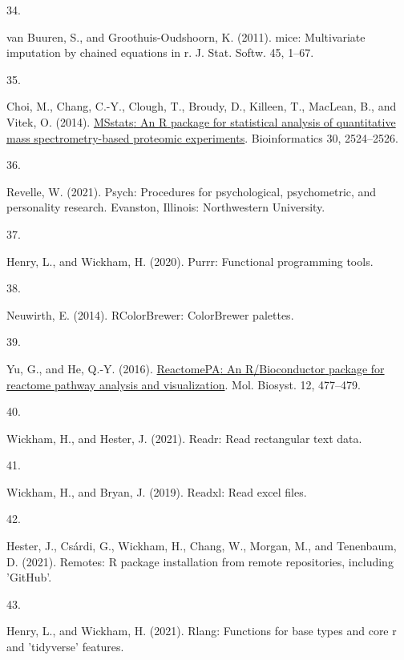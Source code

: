 \documentclass[
]{article}
\newlength{\cslhangindent}
\newlength{\csllabelwidth}
\newlength{\cslentryspacingunit} %
\newenvironment{CSLReferences}[2] %
 {%
  \setlength{\parindent}{0pt}
  \ifodd #1
  \let\oldpar\par
  \def\par{\hangindent=\cslhangindent\oldpar}
  \fi
  \setlength{\parskip}{#2\cslentryspacingunit}
 }%
 {}
\newcommand{\CSLLeftMargin}[1]{\parbox[t]{\csllabelwidth}{#1}}
\newcommand{\CSLRightInline}[1]{\parbox[t]{\linewidth - \csllabelwidth}{#1}\break}
\begin{document}
\begin{CSLReferences}{0}{0}
\leavevmode{}%
\CSLLeftMargin{34. }
\CSLRightInline{van Buuren, S., and Groothuis-Oudshoorn, K. (2011). {mice}: {Multivariate} imputation by chained equations in r. J. Stat. Softw. 45, 1--67.}

\leavevmode{}%
\CSLLeftMargin{35. }
\CSLRightInline{Choi, M., Chang, C.-Y., Clough, T., Broudy, D., Killeen, T., MacLean, B., and Vitek, O. (2014). \href{https://doi.org/10.1093/bioinformatics/btu305}{{MSstats}: An {R} package for statistical analysis of quantitative mass spectrometry-based proteomic experiments}. Bioinformatics 30, 2524--2526.}

\leavevmode{}%
\CSLLeftMargin{36. }
\CSLRightInline{Revelle, W. (2021). Psych: {Procedures} for psychological, psychometric, and personality research. {Evanston, Illinois}: {Northwestern University}.}

\leavevmode{}%
\CSLLeftMargin{37. }
\CSLRightInline{Henry, L., and Wickham, H. (2020). Purrr: {Functional} programming tools.}

\leavevmode{}%
\CSLLeftMargin{38. }
\CSLRightInline{Neuwirth, E. (2014). {RColorBrewer}: {ColorBrewer} palettes.}

\leavevmode{}%
\CSLLeftMargin{39. }
\CSLRightInline{Yu, G., and He, Q.-Y. (2016). \href{https://doi.org/10.1039/c5mb00663e}{{ReactomePA}: An {R}/{Bioconductor} package for reactome pathway analysis and visualization}. Mol. Biosyst. 12, 477--479.}

\leavevmode{}%
\CSLLeftMargin{40. }
\CSLRightInline{Wickham, H., and Hester, J. (2021). Readr: {Read} rectangular text data.}

\leavevmode{}%
\CSLLeftMargin{41. }
\CSLRightInline{Wickham, H., and Bryan, J. (2019). Readxl: {Read} excel files.}

\leavevmode{}%
\CSLLeftMargin{42. }
\CSLRightInline{Hester, J., Csárdi, G., Wickham, H., Chang, W., Morgan, M., and Tenenbaum, D. (2021). Remotes: {R} package installation from remote repositories, including '{GitHub}'.}

\leavevmode{}%
\CSLLeftMargin{43. }
\CSLRightInline{Henry, L., and Wickham, H. (2021). Rlang: {Functions} for base types and core r and 'tidyverse' features.}


\end{CSLReferences}
\end{document}
